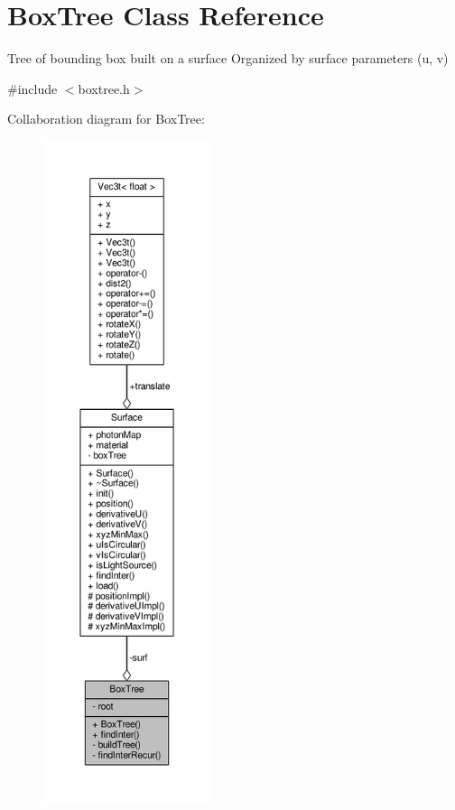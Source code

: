\hypertarget{classBoxTree}{}\section{Box\+Tree Class Reference}
\label{classBoxTree}


Tree of bounding box built on a surface Organized by surface parameters (u, v)  




{\ttfamily \#include $<$boxtree.\+h$>$}



Collaboration diagram for Box\+Tree\+:
\nopagebreak
\begin{figure}[H]
\begin{center}
\leavevmode
\includegraphics[height=550pt]{classBoxTree__coll__graph}
\end{center}
\end{figure}
